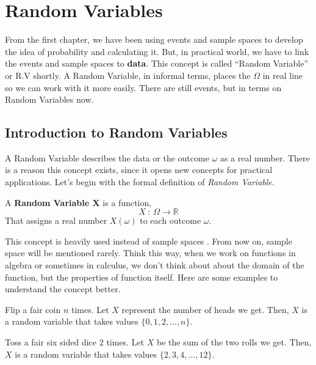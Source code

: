 \chapter{Random Variables}
From the first chapter, we have been using events and sample spaces to develop the idea of probability and calculating it. But, in practical world,  we have to link the events and sample spaces to \textbf{data}. This concept is called ``Random Variable'' or R.V shortly.
A Random Variable, in informal terms, places the $\Omega$ in real line so we can work with it more easily. There are still events, but in terms on Random Variables now.





\section{Introduction to Random Variables}
A Random Variable describes the data or the outcome $\omega$ as a real number. There is a reason this concept exists, since it opens new concepts for practical applications.
\newline
Let's begin with the formal definition of \textit{ Random Variable}.

\begin{definition}
    A \textbf{Random Variable X} is a function,
    $$ X \ : \ \Omega \rightarrow \mathbb{R}$$
    That assigns a real number $X(\omega)$ to each outcome $\omega$.
\end{definition}

This concept is heavily used instead of sample spaces . From now on, sample space will be mentioned rarely. Think this way, when we work on functions in algebra or sometimes in calculus, we don't think about about the domain of the function, but the properties of function itself.
Here are some examples to understand the concept better.

\begin{example}
    Flip a fair coin $n$ times. Let $X$ represent the number of heads we get. Then, $X$ is a random variable that takes values $\{0,1,2,...,n\}$.
\end{example}

\begin{example}
    Toss a fair six sided dice 2 times. Let $X$ be the sum of the two rolls we get. Then, $X$ is a random variable that takes values $\{2,3,4,...,12\}$.
\end{example}

